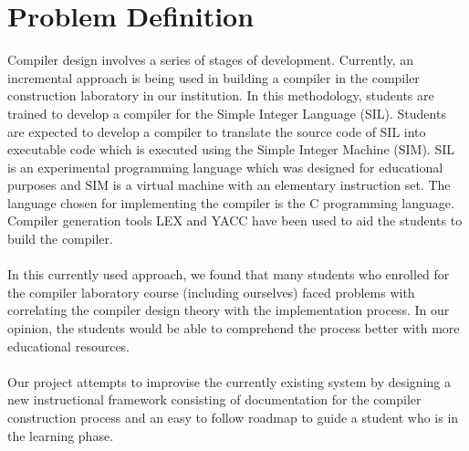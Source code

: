 \chapter{Problem Definition}


Compiler design involves a series of stages of development. Currently, an incremental approach is being used in building a compiler in the compiler construction laboratory in our institution. In this methodology, students are trained to develop a compiler for the Simple Integer Language (SIL). Students are expected to develop a compiler to translate the source code of SIL into executable code which is executed using the Simple Integer Machine (SIM). SIL is an experimental programming language which was designed for educational purposes \cite{citation-3-name-here} and SIM is a virtual machine with an elementary instruction set\cite{citation-4-name-here}. The language chosen for implementing the compiler is the C programming language. Compiler generation tools LEX and YACC have been used to aid the students to build the compiler. 
\\ 
\\
In this currently used approach, we found that many students who enrolled for the compiler laboratory course (including ourselves) faced problems with correlating the compiler design theory with the implementation process. In our opinion, the students would be able to comprehend the process better with more  educational resources. 
\\
\\
Our project attempts to improvise the currently existing system by designing a new instructional framework consisting of documentation for the compiler construction process and an easy to follow roadmap to guide a student who is in the learning phase.   